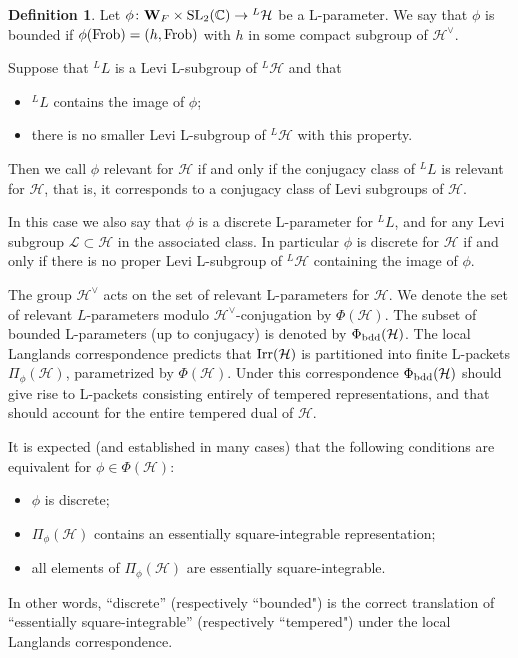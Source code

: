 \documentclass[11pt]{amsart}
\theoremstyle{definition}
\newtheorem{defn}[thm]{Definition}
\newcommand{\mb}{\mathbf}
\newcommand{\C}{\mathbb C}
\def\Irr{{\rm Irr}}
\def\SL{{\rm SL}}
\def\cL{{\mathcal L}}
\def\cH{{\mathcal H}}
\def\Fr{{\rm Frob}}
\def\bdd{{\rm bdd}}
\def\bdd{{\rm bdd}}
\begin{document}
\begin{defn}\label{def:7.3}
Let $\phi \colon \mb W_F \times \SL_2 (\C) \to {}^L \cH$ be a L-parameter. 
We say that $\phi$ is bounded if $\phi (\Fr) = (h,\Fr)$ with $h$ in some
compact subgroup of $\cH^\vee$.

Suppose that ${}^L L$ is a Levi L-subgroup of ${}^L \cH$ and that
\begin{itemize}
\item ${}^L L$ contains the image of $\phi$;
\item there is no smaller Levi L-subgroup of ${}^L \cH$ with this property.
\end{itemize}
Then we call $\phi$ relevant for $\cH$ if and only if the conjugacy class of 
${}^L L$ is relevant for $\cH$, that is, it corresponds
to a conjugacy class of Levi subgroups of $\cH$. 

In this case we also say that $\phi$ is a discrete L-parameter for ${}^L L$, 
and for any Levi subgroup $\cL \subset \cH$ in the associated class. In particular 
$\phi$ is discrete for $\cH$ if and only
if there is no proper Levi L-subgroup of ${}^L \cH$ containing the image of $\phi$.
\end{defn}

The group $\cH^\vee$ acts on the set of relevant L-parameters for $\cH$.
We denote the set of relevant $L$-parameters modulo $\cH^\vee$-conjugation
by $\Phi (\cH)$. The subset of bounded L-parameters (up to conjugacy) is denoted by
$\Phi_{\bdd}(\cH)$.
The local Langlands correspondence predicts that $\Irr (\cH)$
is partitioned into finite L-packets $\Pi_\phi (\cH)$, parametrized by $\Phi (\cH)$.
Under this correspondence $\Phi_{\bdd}(\cH)$ should give rise to L-packets
consisting entirely of tempered representations, and that should account
for the entire tempered dual of $\cH$.

It is expected (and established in many cases)
that the following conditions are equivalent for $\phi \in \Phi (\cH)$:
\begin{itemize}
\item $\phi$ is discrete;
\item $\Pi_\phi (\cH)$ contains an essentially square-integrable representation;
\item all elements of $\Pi_\phi (\cH)$ are essentially square-integrable.
\end{itemize}
In other words, ``discrete'' (respectively ``bounded") is the correct translation 
of ``essentially square-integrable'' (respectively ``tempered") under the local 
Langlands correspondence.
\end{document}
